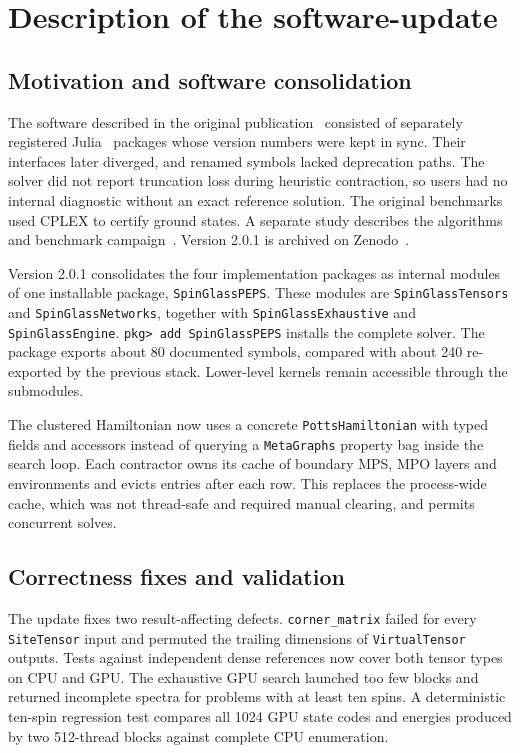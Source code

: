 \documentclass[preprint,12pt,a4paper]{elsarticle}
\begin{document}
\section{Description of the software-update}
\label{Description of the software-update}

\subsection{Motivation and software consolidation}

The software described in the original publication~\cite{smierzchalski2025spinglasspeps}
consisted of separately registered Julia~\cite{bezanson2017julia} packages whose
version numbers were kept in sync. Their interfaces later diverged, and renamed
symbols lacked deprecation paths. The solver did not report truncation loss
during heuristic contraction, so users had no internal diagnostic without an
exact reference solution. The original benchmarks used CPLEX to certify ground
states. A separate study describes the algorithms and benchmark
campaign~\cite{dziubyna2025limitations}. Version 2.0.1 is archived on
Zenodo~\cite{spinglasspeps_zenodo}.

Version 2.0.1 consolidates the four implementation packages as internal modules
of one installable package, \texttt{SpinGlassPEPS}. These modules are
\texttt{SpinGlassTensors} and \texttt{SpinGlassNetworks}, together with
\texttt{SpinGlassExhaustive} and \texttt{SpinGlassEngine}.
\texttt{pkg> add SpinGlassPEPS} installs the complete solver.
The package exports about 80 documented symbols, compared with about 240
re-exported by the previous stack.
Lower-level kernels remain accessible through the submodules.

The clustered Hamiltonian now uses a concrete \texttt{PottsHamiltonian} with
typed fields and accessors instead of querying a \texttt{MetaGraphs} property bag
inside the search loop. Each contractor owns its cache of boundary MPS, MPO
layers and environments and evicts entries after each row. This replaces the
process-wide cache, which was not thread-safe and required manual clearing, and
permits concurrent solves.

\subsection{Correctness fixes and validation}

The update fixes two result-affecting defects. \texttt{corner\_matrix} failed
for every \texttt{SiteTensor} input and permuted the trailing dimensions of
\texttt{VirtualTensor} outputs. Tests against independent dense references now
cover both tensor types on CPU and GPU. The exhaustive GPU search launched too few
blocks and returned incomplete spectra for problems with at least ten spins. A
deterministic ten-spin regression test compares all 1024 GPU state codes and
energies produced by two 512-thread blocks against complete CPU enumeration.
\end{document}
